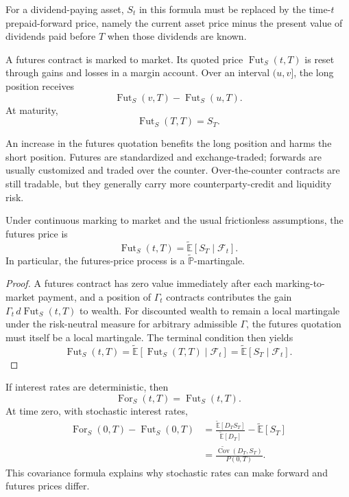 For a dividend-paying asset, $S_t$ in this formula must be replaced by the time-$t$ prepaid-forward price, namely the current asset price minus the present value of dividends paid before $T$ when those dividends are known.

\begin{de}
A futures contract is marked to market. Its quoted price $\operatorname{Fut}_S(t,T)$ is reset through gains and losses in a margin account. Over an interval $(u,v]$, the long position receives
\[
\operatorname{Fut}_S(v,T)-\operatorname{Fut}_S(u,T).
\]
At maturity,
\[
\operatorname{Fut}_S(T,T)=S_T.
\]
\end{de}

An increase in the futures quotation benefits the long position and harms the short position. Futures are standardized and exchange-traded; forwards are usually customized and traded over the counter. Over-the-counter contracts are still tradable, but they generally carry more counterparty-credit and liquidity risk.

\begin{thm}
Under continuous marking to market and the usual frictionless assumptions, the futures price is
\[
\boxed{\operatorname{Fut}_S(t,T)
=\widetilde{\mathbb{E}}[S_T\mid\mathcal{F}_t].}
\]
In particular, the futures-price process is a $\widetilde{\mathbb{P}}$-martingale.
\end{thm}

\begin{proof}
A futures contract has zero value immediately after each marking-to-market payment, and a position of $\Gamma_t$ contracts contributes the gain $\Gamma_t\,d\operatorname{Fut}_S(t,T)$ to wealth. For discounted wealth to remain a local martingale under the risk-neutral measure for arbitrary admissible $\Gamma$, the futures quotation must itself be a local martingale. The terminal condition then yields
\[
\operatorname{Fut}_S(t,T)
=\widetilde{\mathbb{E}}[\operatorname{Fut}_S(T,T)\mid\mathcal{F}_t]
=\widetilde{\mathbb{E}}[S_T\mid\mathcal{F}_t].
\]
\end{proof}

If interest rates are deterministic, then
\[
\operatorname{For}_S(t,T)
=\operatorname{Fut}_S(t,T).
\]
At time zero, with stochastic interest rates,
\[
\begin{aligned}
\operatorname{For}_S(0,T)-\operatorname{Fut}_S(0,T)
&=\frac{\widetilde{\mathbb{E}}[D_TS_T]}
        {\widetilde{\mathbb{E}}[D_T]}
  -\widetilde{\mathbb{E}}[S_T]\\
&=\frac{\widetilde{\operatorname{Cov}}(D_T,S_T)}{P(0,T)}.
\end{aligned}
\]
This covariance formula explains why stochastic rates can make forward and futures prices differ.


